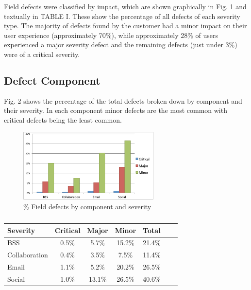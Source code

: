 \documentclass[conference]{IEEEtran}
\begin{document}

Field defects were classified by impact, which are shown graphically in Fig. 1 and textually in TABLE I.  These show the percentage of all defects of each severity type. The majority of defects found by the customer had a minor impact on their user experience (approximately 70\%), while approximately 28\% of users experienced a major severity defect and the remaining defects (just under 3\%) were of a critical severity.

\subsection{Defect Component}

Fig. 2  shows the percentage of the total defects broken down by component and their severity. In each component minor defects are the most common with critical defects being the least common.

\begin{figure}
\begin{center}
\includegraphics[height=3.7cm]{graphs/graph2.pdf} 
\caption{\% Field defects by component and severity}
\end{center}
\label{fig:defectcomp}
\end{figure}


\begin {table}[]
\caption {}
\begin{center}
\begin{tabular}{l*{5}{c}r} Severity & Critical & Major & Minor &  Total \\ \hline BSS & 0.5\%	& 5.7\% & 15.2\% & 21.4\% \\ Collaboration &	0.4\% & 3.5\% & 7.5\% & 11.4\% \\ Email	& 1.1\% & 5.2\% & 20.2\%	 & 26.5\%  \\  Social	& 1.0\% & 13.1\% & 26.5\% & 40.6\% \end{tabular}
\end{center}
\end{table}
\end{document}
